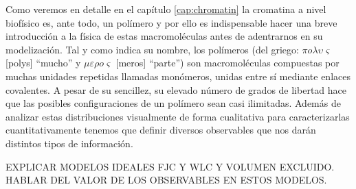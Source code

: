 Como veremos en detalle en el capítulo \ref{cap:chromatin} la cromatina a nivel biofísico es, ante todo, un polímero y por ello es indispensable hacer una breve introducción a la física de estas macromoléculas antes de adentrarnos en su modelización. Tal y como indica su nombre, los polímeros (del griego: $\pi o \lambda \upsilon \varsigma$ [polys] ``mucho'' y $\mu \varepsilon \rho o \varsigma$ [meros] ``parte'') son macromoléculas compuestas por muchas unidades repetidas llamadas monómeros, unidas entre sí mediante enlaces covalentes. A pesar de su sencillez, su elevado número de grados de libertad hace que las posibles configuraciones de un polímero sean casi ilimitadas. Además de analizar estas distribuciones visualmente de forma cualitativa para caracterizarlas cuantitativamente tenemos que definir diversos observables que nos darán distintos tipos de información.

EXPLICAR MODELOS IDEALES FJC Y WLC Y VOLUMEN EXCLUIDO. HABLAR DEL VALOR DE LOS OBSERVABLES EN ESTOS MODELOS.
